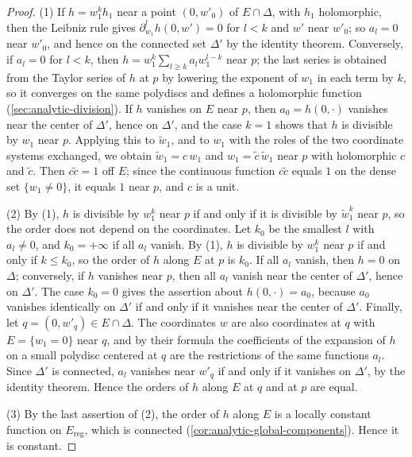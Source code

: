\begin{proof}
(1) If $h=w_1^kh_1$ near a point $(0,w'_0)$ of $E\cap\Delta$, with $h_1$ holomorphic, then the Leibniz rule gives $\partial_{w_1}^lh(0,w')=0$ for $l<k$ and $w'$ near $w'_0$; so $a_l=0$ near $w'_0$, and hence on the connected set $\Delta'$ by the identity theorem. Conversely, if $a_l=0$ for $l<k$, then $h=w_1^k\sum_{l\geq k}a_lw_1^{l-k}$ near $p$; the last series is obtained from the Taylor series of $h$ at $p$ by lowering the exponent of $w_1$ in each term by $k$, so it converges on the same polydiscs and defines a holomorphic function (\cref{sec:analytic-division}). If $h$ vanishes on $E$ near $p$, then $a_0=h(0,\cdot)$ vanishes near the center of $\Delta'$, hence on $\Delta'$, and the case $k=1$ shows that $h$ is divisible by $w_1$ near $p$. Applying this to $\tilde w_1$, and to $w_1$ with the roles of the two coordinate systems exchanged, we obtain $\tilde w_1=c\,w_1$ and $w_1=\tilde c\,\tilde w_1$ near $p$ with holomorphic $c$ and $\tilde c$. Then $c\tilde c=1$ off $E$; since the continuous function $c\tilde c$ equals $1$ on the dense set $\{w_1\neq0\}$, it equals $1$ near $p$, and $c$ is a unit.

(2) By (1), $h$ is divisible by $w_1^k$ near $p$ if and only if it is divisible by $\tilde w_1^k$ near $p$, so the order does not depend on the coordinates. Let $k_0$ be the smallest $l$ with $a_l\neq0$, and $k_0=+\infty$ if all $a_l$ vanish. By (1), $h$ is divisible by $w_1^k$ near $p$ if and only if $k\leq k_0$, so the order of $h$ along $E$ at $p$ is $k_0$. If all $a_l$ vanish, then $h=0$ on $\Delta$; conversely, if $h$ vanishes near $p$, then all $a_l$ vanish near the center of $\Delta'$, hence on $\Delta'$. The case $k_0=0$ gives the assertion about $h(0,\cdot)=a_0$, because $a_0$ vanishes identically on $\Delta'$ if and only if it vanishes near the center of $\Delta'$. Finally, let $q=(0,w'_q)\in E\cap\Delta$. The coordinates $w$ are also coordinates at $q$ with $E=\{w_1=0\}$ near $q$, and by their formula the coefficients of the expansion of $h$ on a small polydisc centered at $q$ are the restrictions of the same functions $a_l$. Since $\Delta'$ is connected, $a_l$ vanishes near $w'_q$ if and only if it vanishes on $\Delta'$, by the identity theorem. Hence the orders of $h$ along $E$ at $q$ and at $p$ are equal.

(3) By the last assertion of (2), the order of $h$ along $E$ is a locally constant function on $E_{\mathrm{reg}}$, which is connected (\cref{cor:analytic-global-components}). Hence it is constant.


\end{proof}
